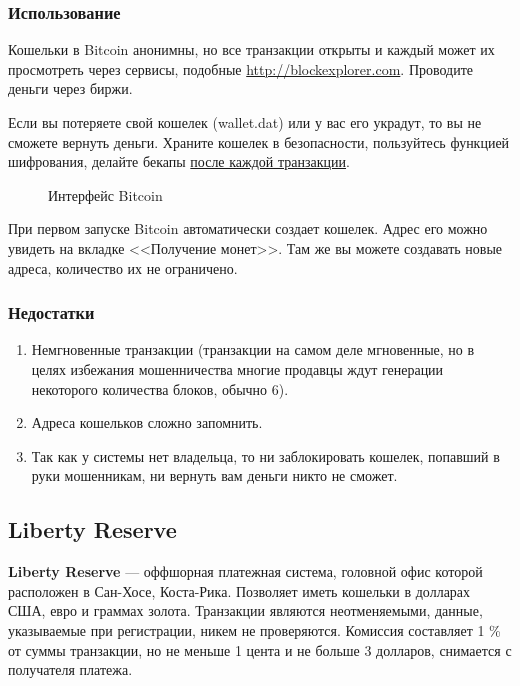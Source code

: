 \subsubsection{Использование}
\begin{important}
Кошельки в Bitcoin анонимны, но все транзакции открыты и каждый может их просмотреть через сервисы, подобные \url{http://blockexplorer.com}. Проводите деньги через биржи.
\end{important}
\begin{important}
Если вы потеряете свой кошелек (wallet.dat) или у вас его украдут, то вы не сможете вернуть деньги. Храните кошелек в безопасности, пользуйтесь функцией 
шифрования, делайте бекапы \underline{после каждой транзакции}.\end{important}
\begin{figure}[h]
\caption{Интерфейс Bitcoin}
\end{figure}
При первом запуске Bitcoin автоматически создает кошелек. Адрес его можно увидеть на вкладке <<Получение монет>>. Там же вы можете создавать новые адреса, количество их не ограничено.
\subsubsection{Недостатки}
\begin{enumerate}
\item Немгновенные транзакции (транзакции на самом деле мгновенные, но в целях избежания мошенничества многие продавцы ждут генерации некоторого количества 
блоков, 
обычно 6).
\item Адреса кошельков сложно запомнить.
\item Так как у системы нет владельца, то ни заблокировать кошелек, попавший в руки мошенникам, ни вернуть вам деньги никто не сможет.
\end{enumerate}
\subsection{Liberty Reserve}
\textbf{Liberty Reserve} --- оффшорная платежная система, головной офис которой расположен в Сан-Хосе, Коста-Рика. Позволяет иметь кошельки в долларах США, евро и граммах золота. Транзакции являются неотменяемыми, данные, указываемые при регистрации, никем не проверяются. Комиссия составляет 1 \% от суммы транзакции, но не меньше 1 цента и не больше 3 долларов, снимается с получателя платежа.
